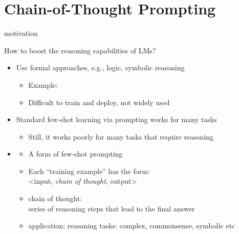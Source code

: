 \section{Chain-of-Thought Prompting}

\begin{frame}[shrink=8]{\cotpfullcap motivation}


\vfill

How to boost the reasoning capabilities of LMs? 

\begin{itemize}
\item Use formal approaches, e.g., logic, symbolic reasoning
    \begin{itemize}
    \item Example: 
\item Difficult to train and deploy, not widely used
    \end{itemize}
\item Standard few-shot learning via prompting works for many tasks
    \begin{itemize}
    \item Still, it works poorly for many tasks that require reasoning
    \end{itemize}
\item \cotp
    \begin{itemize}
    \item A form of few-shot prompting
    \item Each ``training example'' has the form:\\ <input, \textit{chain of thought}, output>
    \item chain of thought:\\ series of reasoning steps that
    lead to the final answer
  \item application:
    reasoning tasks:
    complex, commonsense, symbolic etc
    \end{itemize}

\end{itemize}

\vfill

\end{frame}

